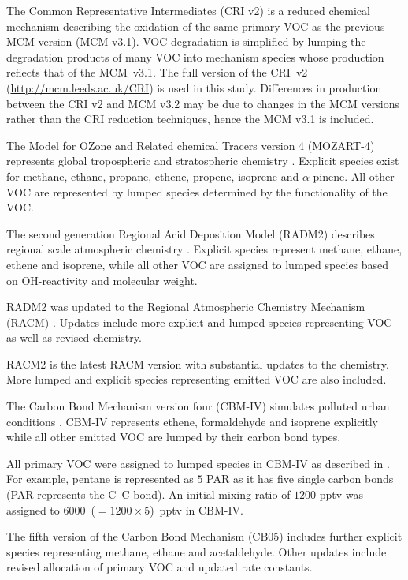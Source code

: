 The Common Representative Intermediates (CRI v2) \citep{Jenkin:2008} is a reduced chemical mechanism describing the oxidation of the same primary VOC as the previous MCM version (MCM v3.1). 
VOC degradation is simplified by lumping the degradation products of many VOC into mechanism species whose  production reflects that of the \mbox{MCM v3.1}. 
The full version of the \mbox{CRI v2} (\url{http://mcm.leeds.ac.uk/CRI}) is used in this study.
Differences in  production between the CRI v2 and MCM v3.2 may be due to changes in the MCM versions rather than the CRI reduction techniques, hence the MCM v3.1 is included.

The Model for OZone and Related chemical Tracers version 4 (MOZART-4) represents global tropospheric and stratospheric chemistry \citep{Emmons:2010}. 
Explicit species exist for methane, ethane, propane, ethene, propene, isoprene and $\alpha$-pinene.
All other VOC are represented by lumped species determined by the functionality of the VOC.

The second generation Regional Acid Deposition Model (RADM2) describes regional scale atmospheric chemistry \citep{Stockwell:1990}. 
Explicit species represent methane, ethane, ethene and isoprene, while all other VOC are assigned to lumped species based on OH-reactivity and molecular weight.

RADM2 was updated to the Regional Atmospheric Chemistry Mechanism (RACM) \citep{Stockwell:1997}. 
Updates include more explicit and lumped species representing VOC as well as revised chemistry.

RACM2 is the latest RACM version \citep{Goliff:2013} with substantial updates to the chemistry. 
More lumped and explicit species representing emitted VOC are also included.

The Carbon Bond Mechanism version four (CBM-IV) simulates polluted urban conditions \citep{Gery:1989}. 
CBM-IV represents ethene, formaldehyde and isoprene explicitly while all other emitted VOC are lumped by their carbon bond types. 

All primary VOC were assigned to lumped species in CBM-IV as described in \citet{Hogo:1989}. 
For example, pentane is represented as $5$ PAR as it has five single carbon bonds (PAR represents the C--C bond).
An initial mixing ratio of $1200$ pptv was assigned to \mbox{$6000$ ($= 1200 \times 5$) pptv} in CBM-IV.

The fifth version of the Carbon Bond Mechanism (CB05) \citep{Yarwood:2005} includes further explicit species representing methane, ethane and acetaldehyde. 
Other updates include revised allocation of primary VOC and updated rate constants.

